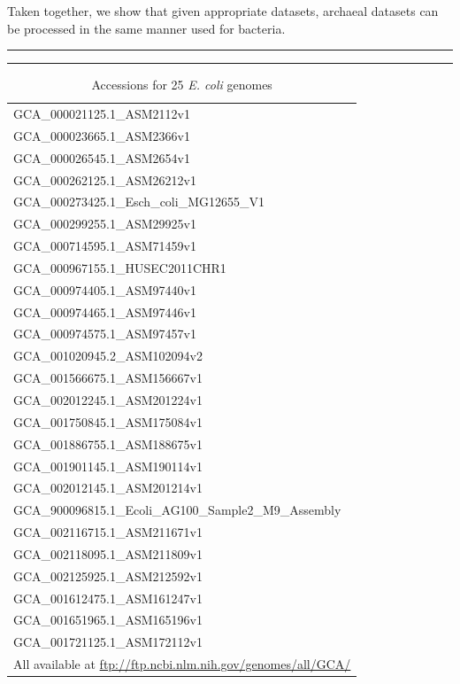 \documentclass[10pt]{article}
\def \thoughtbr {\begin{center}\noindent\rule{.4\textwidth}{0.4pt}  {\raisebox{-.5ex}{$\sim$}}  \rule{.4\textwidth}{0.4pt}\end{center}}
\begin{document}
Taken together, we show that given appropriate datasets, archaeal datasets can be processed in the same manner used for bacteria.

\thoughtbr

\begin{table}[!h]
\centering
\caption{Accessions for 25 \textit{E. coli} genomes}
\label{table:accessions}
\begin{tabular}{l}
  \toprule
  GCA\_000021125.1\_ASM2112v1 \\
  GCA\_000023665.1\_ASM2366v1 \\
  GCA\_000026545.1\_ASM2654v1 \\
  GCA\_000262125.1\_ASM26212v1 \\
  GCA\_000273425.1\_Esch\_coli\_MG12655\_V1 \\
  GCA\_000299255.1\_ASM29925v1 \\
  GCA\_000714595.1\_ASM71459v1 \\
  GCA\_000967155.1\_HUSEC2011CHR1 \\
  GCA\_000974405.1\_ASM97440v1 \\
  GCA\_000974465.1\_ASM97446v1 \\
  GCA\_000974575.1\_ASM97457v1 \\
  GCA\_001020945.2\_ASM102094v2 \\
  GCA\_001566675.1\_ASM156667v1 \\
  GCA\_002012245.1\_ASM201224v1 \\
  GCA\_001750845.1\_ASM175084v1 \\
  GCA\_001886755.1\_ASM188675v1 \\
  GCA\_001901145.1\_ASM190114v1 \\
  GCA\_002012145.1\_ASM201214v1 \\
  GCA\_900096815.1\_Ecoli\_AG100\_Sample2\_M9\_Assembly \\
  GCA\_002116715.1\_ASM211671v1 \\
  GCA\_002118095.1\_ASM211809v1 \\
  GCA\_002125925.1\_ASM212592v1 \\
  GCA\_001612475.1\_ASM161247v1 \\
  GCA\_001651965.1\_ASM165196v1 \\
  GCA\_001721125.1\_ASM172112v1\\
  \bottomrule
  {\tiny   All available at \url{ftp://ftp.ncbi.nlm.nih.gov/genomes/all/GCA/}}

\end{tabular}
\end{table}
\end{document}
